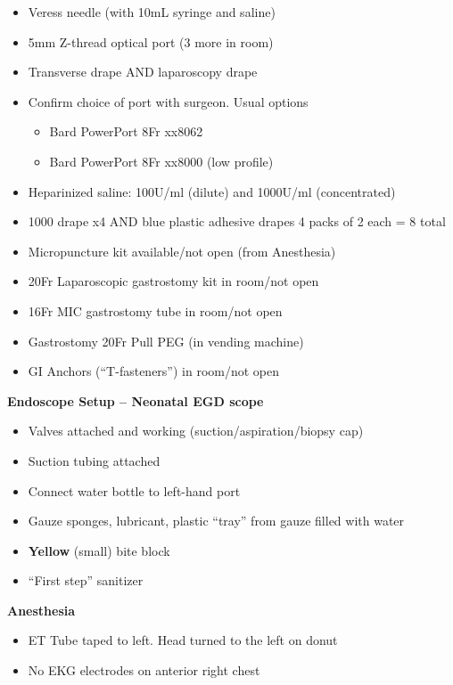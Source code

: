 \documentclass[
]{book}
\providecommand{\tightlist}{%
  \setlength{\itemsep}{0pt}\setlength{\parskip}{0pt}}
\begin{document}
\begin{itemize}
\tightlist
\item
  Veress needle (with 10mL syringe and saline)
\item
  5mm Z-thread optical port (3 more in room)
\item
  Transverse drape AND laparoscopy drape
\item
  Confirm choice of port with surgeon. Usual options

  \begin{itemize}
  \tightlist
  \item
    Bard PowerPort 8Fr xx8062
  \item
    Bard PowerPort 8Fr xx8000 (low profile)
  \end{itemize}
\item
  Heparinized saline: 100U/ml (dilute) and 1000U/ml (concentrated)
\item
  1000 drape x4 AND blue plastic adhesive drapes 4 packs of 2 each = 8 total
\item
  Micropuncture kit available/not open (from Anesthesia)
\item
  20Fr Laparoscopic gastrostomy kit in room/not open
\item
  16Fr MIC gastrostomy tube in room/not open
\item
  Gastrostomy 20Fr Pull PEG (in vending machine)
\item
  GI Anchors (``T-fasteners'') in room/not open
\end{itemize}

\textbf{Endoscope Setup -- Neonatal EGD scope}

\begin{itemize}
\tightlist
\item
  Valves attached and working (suction/aspiration/biopsy cap)
\item
  Suction tubing attached
\item
  Connect water bottle to left-hand port
\item
  Gauze sponges, lubricant, plastic ``tray'' from gauze filled with water
\item
  \textbf{Yellow} (small) bite block
\item
  ``First step'' sanitizer
\end{itemize}

\textbf{Anesthesia}

\begin{itemize}
\tightlist
\item
  ET Tube taped to left. Head turned to the left on donut
\item
  No EKG electrodes on anterior right chest
\end{itemize}
\end{document}
